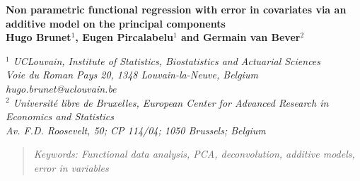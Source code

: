 {
    \begin{center}
	\textbf{\large{ Non parametric functional regression with error in covariates via an additive model on the principal
			components}}
	\\[4mm]
	\textbf{Hugo Brunet$^1$, Eugen Pircalabelu$^1$ and Germain van Bever$^2$}
	\\[1ex]
	\tcr{\today}
\end{center}

\begin{center}
	\textit{$^1$ UCLouvain, Institute of Statistics, Biostatistics and Actuarial Sciences\\ Voie du Roman Pays 20, 1348 Louvain-la-Neuve, Belgium\\
		hugo.brunet@uclouvain.be\\
		$^2$ Université libre de Bruxelles, European Center for Advanced Research in Economics and Statistics\\ Av. F.D. Roosevelt, 50; CP 114/04; 1050 Brussels; Belgium}
\end{center}

\begin{abstract}

	\tcb{---}

	\textit{Keywords: Functional data analysis, PCA, deconvolution, additive models, error in variables}\\
    \end{abstract}

}